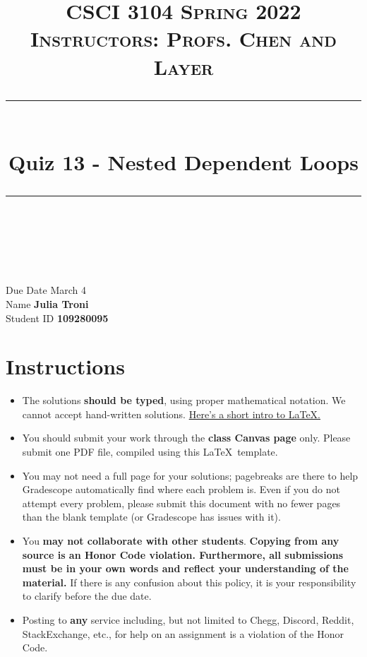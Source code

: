 \documentclass[11pt]{article}
\title{
\normalfont \normalsize 
\textsc{CSCI 3104 Spring 2022 \\ 
Instructors: Profs. Chen and Layer} \\
[10pt] 
\rule{\linewidth}{0.5pt} \\[6pt] 
\huge Quiz 13 - Nested Dependent Loops \\
\rule{\linewidth}{2pt}  \\[10pt]
}
\date{}
\theoremstyle{definition}
\theoremstyle{definition}
\theoremstyle{definition}
\begin{document}

\maketitle


\noindent
Due Date \dotfill March 4 \\
Name \dotfill \textbf{Julia Troni} \\
Student ID \dotfill \textbf{109280095} \\


\tableofcontents

\section{Instructions}
 \begin{itemize}
	\item The solutions \textbf{should be typed}, using proper mathematical notation. We cannot accept hand-written solutions. \href{http://ece.uprm.edu/~caceros/latex/introduction.pdf}{Here's a short intro to \LaTeX.}
	\item You should submit your work through the \textbf{class Canvas page} only. Please submit one PDF file, compiled using this \LaTeX \ template.
	\item You may not need a full page for your solutions; pagebreaks are there to help Gradescope automatically find where each problem is. Even if you do not attempt every problem, please submit this document with no fewer pages than the blank template (or Gradescope has issues with it).

	\item You \textbf{may not collaborate with other students}. \textbf{Copying from any source is an Honor Code violation. Furthermore, all submissions must be in your own words and reflect your understanding of the material.} If there is any confusion about this policy, it is your responsibility to clarify before the due date. 

	\item Posting to \textbf{any} service including, but not limited to Chegg, Discord, Reddit, StackExchange, etc., for help on an assignment is a violation of the Honor Code.
\end{itemize}
\end{document}
